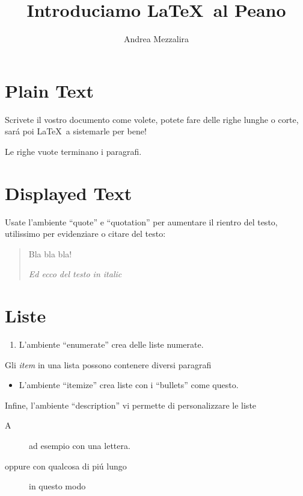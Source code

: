 \documentclass[12pt]{article}
\begin{document}
\title{Introduciamo \LaTeX\  al Peano}
\author{Andrea Mezzalira}
\renewcommand{\today}{23 Ottobre 2017}
\maketitle


\section {Plain Text}
Scrivete il vostro documento come volete, potete
fare delle righe lunghe o corte, sar\'a poi \LaTeX\  a sistemarle
per bene!

Le righe vuote terminano i paragrafi.


\section {Displayed Text}
Usate l'ambiente ``quote'' e ``quotation'' per aumentare il rientro del testo, utilissimo per evidenziare o citare del testo:

\begin{quotation}
Bla bla bla!

\em Ed ecco del testo in italic

\end{quotation}

\section{Liste}

\begin{enumerate}
\item 
L'ambiente ``enumerate'' crea delle liste numerate.
\end{enumerate}


Gli {\em item} in una lista possono contenere diversi paragrafi 

\begin{itemize}
  \item L'ambiente ``itemize'' crea liste con i  ``bullets'' come questo.
\end{itemize}

\noindent Infine, l'ambiente ``description'' vi permette di personalizzare le liste
\begin{description}
    \item[A] ad esempio con una lettera.
    \item[oppure con qualcosa di pi\'u lungo] in questo modo
\end{description}
\end{document}
